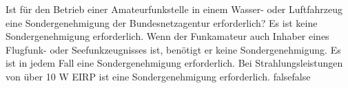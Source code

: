     {Ist für den Betrieb einer Amateurfunkstelle in einem Wasser- oder Luftfahrzeug eine Sondergenehmigung der Bundesnetzagentur erforderlich?}
    {Es ist keine Sondergenehmigung  erforderlich.}
    {Wenn der Funkamateur auch Inhaber eines Flugfunk- oder Seefunkzeugnisses ist, benötigt er keine Sondergenehmigung.}
    {Es ist in jedem Fall eine Sondergenehmigung erforderlich.}
    {Bei Strahlungsleistungen von über 10 W EIRP ist eine Sondergenehmigung erforderlich.}
    {false}{false}